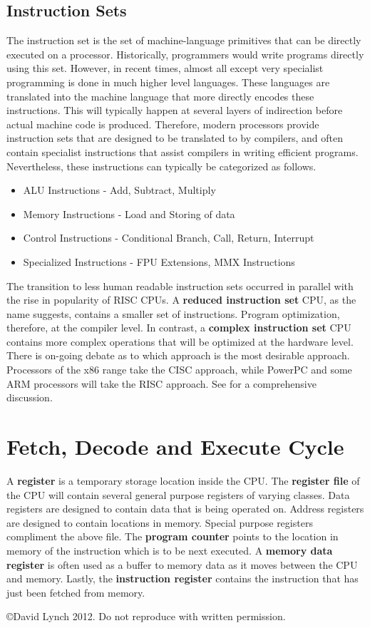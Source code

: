 \documentclass[10pt,a4paper]{article}
\begin{document}
\subsection{Instruction Sets}
The instruction set is the set of machine-language primitives that can be directly executed on a processor. Historically, programmers would write programs directly using this set. However, in recent times, almost all except very specialist programming is done in much higher level languages. These languages are translated into the machine language that more directly encodes these instructions. This will typically happen at several layers of indirection before actual machine code is produced. Therefore, modern processors provide instruction sets that are designed to be translated to by compilers, and often contain specialist instructions that assist compilers in writing efficient programs. Nevertheless, these instructions can typically be categorized as follows. 
\begin{itemize}
\item ALU Instructions - Add, Subtract, Multiply
\item Memory Instructions - Load and Storing of data
\item Control Instructions - Conditional Branch, Call, Return, Interrupt 
\item Specialized Instructions - FPU Extensions, MMX Instructions
\end{itemize}
The transition to less human readable instruction sets occurred in parallel with the rise in popularity of RISC CPUs. A \textbf{reduced instruction set} CPU, as the name suggests, contains a smaller set of instructions. Program optimization, therefore, at the compiler level. In contrast, a \textbf{complex instruction set} CPU contains more complex operations that will be optimized at the hardware level. There is on-going debate as to which approach is the most desirable approach. Processors of the x86 range take the CISC approach, while PowerPC and some ARM processors will take the RISC approach. See \cite{RISC-CISC} for a comprehensive discussion.
\section{Fetch, Decode and Execute Cycle}
A \textbf{register} is a temporary storage location inside the CPU. The \textbf{register file} of the CPU will contain several general purpose registers of varying classes. Data registers are designed to contain data that is being operated on. Address registers are designed to contain locations in memory. Special purpose registers compliment the above file. The \textbf{program counter} points to the location in memory of the instruction which is to be next executed. A \textbf{memory data register} is often used as a buffer to memory data as it moves between the CPU and memory. Lastly, the \textbf{instruction register} contains the instruction that has just been fetched from memory.   






{}

\begin{center}
{\small \copyright  David Lynch 2012. Do not reproduce with written permission.}
\end{center}
\end{document}
